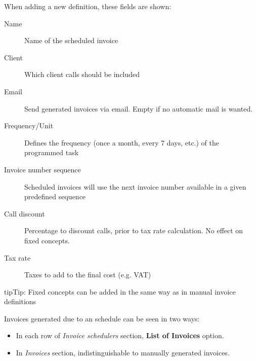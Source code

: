 \documentclass[letterpaper,10pt,english]{sphinxmanual}
\begin{document}
When adding a new definition, these fields are shown:
\begin{description}
\item[{Name}] \leavevmode{}\label{administration_portal/brand/invoicing/invoice_schedulers:term-name}
Name of the scheduled invoice

\item[{Client}] \leavevmode{}\label{administration_portal/brand/invoicing/invoice_schedulers:term-client}
Which client calls should be included

\item[{Email}] \leavevmode{}\label{administration_portal/brand/invoicing/invoice_schedulers:term-email}
Send generated invoices via email. Empty if no automatic mail is wanted.

\item[{Frequency/Unit}] \leavevmode{}\label{administration_portal/brand/invoicing/invoice_schedulers:term-frequency-unit}
Defines the frequency (once a month, every 7 days, etc.) of the programmed task

\item[{Invoice number sequence}] \leavevmode{}\label{administration_portal/brand/invoicing/invoice_schedulers:term-invoice-number-sequence}
Scheduled invoices will use the next invoice number available in a given predefined sequence

\item[{Call discount}] \leavevmode{}\label{administration_portal/brand/invoicing/invoice_schedulers:term-call-discount}
Percentage to discount calls, prior to tax rate calculation. No effect on fixed concepts.

\item[{Tax rate}] \leavevmode{}\label{administration_portal/brand/invoicing/invoice_schedulers:term-tax-rate}
Taxes to add to the final cost (e.g. VAT)

\end{description}

\begin{notice}{tip}{Tip:}
Fixed concepts can be added in the same way as in manual invoice definitions
\end{notice}

Invoices generated due to an schedule can be seen in two ways:
\begin{itemize}
\item {} 
In each row of \emph{Invoice schedulers} section, \textbf{List of Invoices} option.

\item {} 
In \emph{Invoices} section, indistinguishable to manually generated invoices.

\end{itemize}
\end{document}
